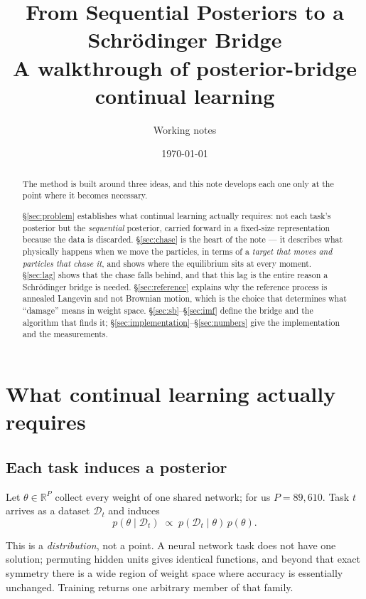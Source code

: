 \documentclass[11pt]{article}
\title{\bfseries From Sequential Posteriors to a Schr\"odinger Bridge\\
\large A walkthrough of posterior-bridge continual learning}
\author{Working notes}
\date{\today}
\theoremstyle{definition}
\theoremstyle{plain}
\theoremstyle{remark}
\newcommand{\Rb}{\mathbb{R}}
\newcommand{\Dt}{\mathcal{D}}
\begin{document}
\maketitle

\begin{abstract}
\noindent
The method is built around three ideas, and this note develops each one only at
the point where it becomes necessary.

\S\ref{sec:problem} establishes what continual learning actually requires: not
each task's posterior but the \emph{sequential} posterior, carried forward in a
fixed-size representation because the data is discarded.
\S\ref{sec:chase} is the heart of the note --- it describes what physically
happens when we move the particles, in terms of a \emph{target that moves and
particles that chase it}, and shows where the equilibrium sits at every moment.
\S\ref{sec:lag} shows that the chase falls behind, and that this lag is the
entire reason a Schr\"odinger bridge is needed.
\S\ref{sec:reference} explains why the reference process is annealed Langevin
and not Brownian motion, which is the choice that determines what ``damage''
means in weight space.
\S\ref{sec:sb}--\S\ref{sec:imf} define the bridge and the algorithm that finds
it; \S\ref{sec:implementation}--\S\ref{sec:numbers} give the implementation and
the measurements.
\end{abstract}

\tableofcontents

\section{What continual learning actually requires}
\label{sec:problem}

\subsection{Each task induces a posterior}

Let $\theta \in \Rb^P$ collect every weight of one shared network; for us
$P = 89{,}610$. Task $t$ arrives as a dataset $\Dt_t$ and induces
\begin{equation}
p(\theta \mid \Dt_t) \;\propto\; p(\Dt_t \mid \theta)\, p(\theta).
\end{equation}

This is a \emph{distribution}, not a point. A neural network task does not have
one solution; permuting hidden units gives identical functions, and beyond that
exact symmetry there is a wide region of weight space where accuracy is
essentially unchanged. Training returns one arbitrary member of that family.
\end{document}
